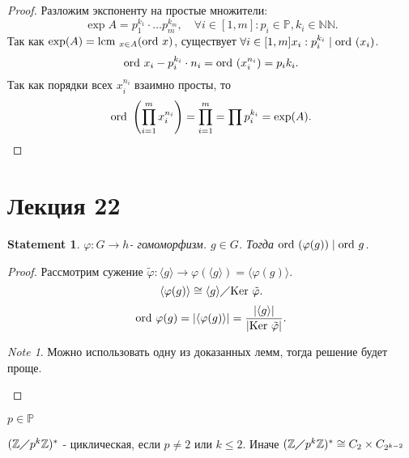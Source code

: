 \documentclass[11pt]{book}
\newcommand{\Z}{\mathbb{Z}}
\newcommand{\N}{\mathbb{N}}
\newcommand{\Pm}{\mathbb{P}}
\newcommand{\ke}{{\mathop{\text{\rm Ker}}}~}
\newcommand{\ord}{{\mathop{\text{\rm ord}}}~}
\newcommand{\lcm}{{\mathop{\text{\rm lcm}}}~}
\theoremstyle{definition}
\theoremstyle{plain}
\theoremstyle{plain}
\newtheorem*{st}{Statement}
\theoremstyle{definition}
\theoremstyle{remark}
\newtheorem*{note}{Note}
\begin{document}
\begin{proof}
    Разложим экспоненту на простые множители: 
    \[
	\exp A = p_1^{k_1} \cdot \ldots p_m^{k_m}, \quad \forall i \in [1, m] : p_i \in  \Pm, k_i \in  \N \N
    .\] 
    Так как $\exp(A) = \lcm_{x \in  A}(\ord x)$, существует $\forall i \in [1, m] x_i : p_i^{k_i} \mid \ord(x_i) $.
    \[
	\ord x_i - p_i^{k_i} \cdot n_i = \ord(x_i^{n_i}) = p_i{k_i}
    .\] 
    Так как порядки всех $x_i^{n_i}$ взаимно просты, то \[
	\ord\left(\prod\limits_{i=1}^{m} x_i^{n_i}\right) = \prod\limits_{i=1}^m = \prod p_i^{k_i} = \exp(A)
    .\]  
\end{proof}
\section{Лекция 22}
\begin{st}
$\varphi: G \to  h $- гомоморфизм. $g \in  G$.
Тогда $\ord(\varphi(g)) \mid \ord g $.
\end{st}
\begin{proof}
    Рассмотрим  сужение $\tilde \varphi: \langle g \rangle \to  \varphi (\langle g \rangle) = \langle \varphi(g) \rangle$. \[
	\langle \varphi(g) \rangle \cong \langle g \rangle \diagup \ke \tilde \varphi
    .\] 
    \[
	\ord \varphi (g) = |\langle \varphi (g) \rangle| = \frac{|\langle g \rangle|}{| \ke \tilde \varphi|}
    .\] 
    \begin{note}
        Можно использовать одну из доказанных лемм, тогда решение будет проще.
    \end{note}
\end{proof}
\begin{thm}$p \in  \Pm$

    $(\Z \diagup p^k \Z)^{*}$ - циклическая, если $p \ne 2$ или $k \le  2$. Иначе
    $(\Z \diagup p^k \Z)^{*} \cong C_2 \times C_{2^{k-2}}$ 
\end{thm}
\end{document}
